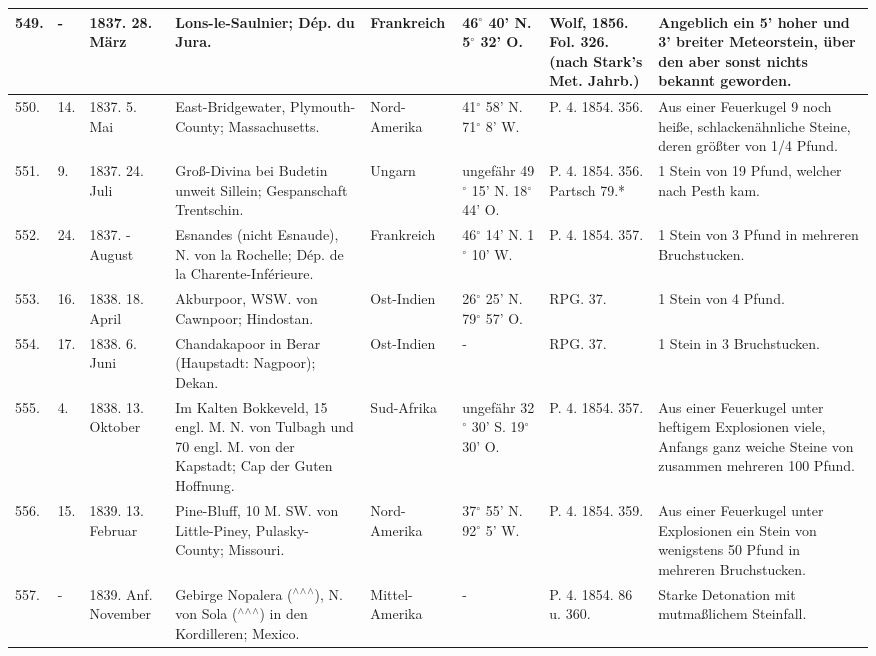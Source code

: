 \documentclass[a4paper, 11pt, oneside, polutonikogreek, german]{article}
\begin{document}
\begin{table}[!ht]
\begin{tabular}{|l|l|l|l|l|l|l|l|}
        549. & - & 1837. 28. März & Lons-le-Saulnier; Dép. du Jura. & Frankreich & 46$^\circ$ 40' N. 5$^\circ$ 32' O. & Wolf, 1856. Fol. 326. (nach Stark's Met. Jahrb.) & Angeblich ein 5' hoher und 3' breiter Meteorstein, über den aber sonst nichts bekannt geworden. \\ \hline
        550. & 14. & 1837. 5. Mai & East-Bridgewater, Plymouth-County; Massachusetts. & Nord-Amerika & 41$^\circ$ 58' N. 71$^\circ$ 8' W. & P. 4. 1854. 356. & Aus einer Feuerkugel 9 noch heiße, schlackenähnliche Steine, deren größter von 1/4 Pfund. \\ \hline
        551. & 9. & 1837. 24. Juli & Groß-Divina bei Budetin unweit Sillein; Gespanschaft Trentschin. & Ungarn & ungefähr 49$^\circ$ 15' N. 18$^\circ$ 44' O. & P. 4. 1854. 356. Partsch 79.* & 1 Stein von 19 Pfund, welcher nach Pesth kam. \\ \hline
        552. & 24. & 1837. - August & Esnandes (nicht Esnaude), N. von la Rochelle; Dép. de la Charente-Inférieure. & Frankreich & 46$^\circ$ 14' N. 1$^\circ$ 10' W. & P. 4. 1854. 357. & 1 Stein von 3 Pfund in mehreren Bruchstucken. \\ \hline
        553. & 16. & 1838. 18. April & Akburpoor, WSW. von Cawnpoor; Hindostan. & Ost-Indien & 26$^\circ$ 25' N. 79$^\circ$ 57' O. & RPG. 37. & 1 Stein von 4 Pfund. \\ \hline
        554. & 17. & 1838. 6. Juni & Chandakapoor in Berar (Haupstadt: Nagpoor); Dekan. & Ost-Indien & - & RPG. 37. & 1 Stein in 3 Bruchstucken. \\ \hline
        555. & 4. & 1838. 13. Oktober & Im Kalten Bokkeveld, 15 engl. M. N. von Tulbagh und 70 engl. M. von der Kapstadt; Cap der Guten Hoffnung. & Sud-Afrika & ungefähr 32$^\circ$ 30' S. 19$^\circ$ 30' O. & P. 4. 1854. 357. & Aus einer Feuerkugel unter heftigem Explosionen viele, Anfangs ganz weiche Steine von zusammen mehreren 100 Pfund. \\ \hline
        556. & 15. & 1839. 13. Februar & Pine-Bluff, 10 M. SW. von Little-Piney, Pulasky-County; Missouri. & Nord-Amerika & 37$^\circ$ 55' N. 92$^\circ$ 5' W. & P. 4. 1854. 359. & Aus einer Feuerkugel unter Explosionen ein Stein von wenigstens 50 Pfund in mehreren Bruchstucken. \\ \hline
        557. & - & 1839. Anf. November & Gebirge Nopalera ($^\wedge$$^\wedge$$^\wedge$), N. von Sola ($^\wedge$$^\wedge$$^\wedge$) in den Kordilleren; Mexico. & Mittel-Amerika & - & P. 4. 1854. 86 u. 360. & Starke Detonation mit mutmaßlichem Steinfall. \\ \hline

\end{tabular}
\end{table}
\end{document}
